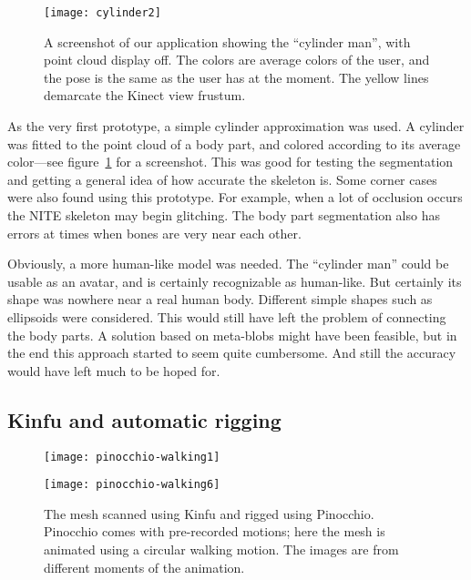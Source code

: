 \begin{figure}
    \centering
    \texttt{[image: cylinder2]}
    \caption{A screenshot of our application showing the ``cylinder man'', with point cloud display off. The colors are average colors of the user, and the pose is the same as the user has at the moment. The yellow lines demarcate the Kinect view frustum.}
    \label{fig:cylinders}
\end{figure}


As the very first prototype, a simple cylinder approximation was used. A cylinder was fitted to the point cloud of a body part, and colored according to its average color---see figure~\ref{fig:cylinders} for a screenshot. This was good for testing the segmentation and getting a general idea of how accurate the skeleton is. Some corner cases were also found using this prototype. For example, when a lot of occlusion occurs the NITE skeleton may begin glitching. The body part segmentation also has errors at times when bones are very near each other.

Obviously, a more human-like model was needed. The ``cylinder man'' could be usable as an avatar, and is certainly recognizable as human-like. But certainly its shape was nowhere near a real human body. Different simple shapes such as ellipsoids were considered. This would still have left the problem of connecting the body parts. A solution based on meta-blobs might have been feasible, but in the end this approach started to seem quite cumbersome. And still the accuracy would have left much to be hoped for.


\subsection{Kinfu and automatic rigging} \label{approach.autorig}

\begin{figure}
    \centering
    \begin{minipage}{0.49\textwidth}
        \texttt{[image: pinocchio-walking1]}
    \end{minipage}
    \begin{minipage}{0.49\textwidth}
        \texttt{[image: pinocchio-walking6]}
    \end{minipage}
    \caption{The mesh scanned using Kinfu and rigged using Pinocchio. Pinocchio comes with pre-recorded motions; here the mesh is animated using a circular walking motion. The images are from different moments of the animation.}
    \label{fig:hannu-front}
\end{figure}

